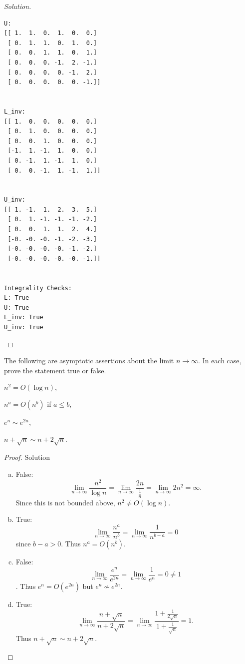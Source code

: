 \documentclass{article}
\newenvironment{problem}[2][Problem]{\begin{trivlist}
\item[\hskip \labelsep {\bfseries #1}\hskip \labelsep {\bfseries #2.}]}{\end{trivlist}}
\theoremstyle{definition}
\begin{document}
\begin{proof}[Solution]
\begin{verbatim}
U:
[[ 1.  1.  0.  1.  0.  0.]
 [ 0.  1.  1.  0.  1.  0.]
 [ 0.  0.  1.  1.  0.  1.]
 [ 0.  0.  0. -1.  2. -1.]
 [ 0.  0.  0.  0. -1.  2.]
 [ 0.  0.  0.  0.  0. -1.]]


L_inv:
[[ 1.  0.  0.  0.  0.  0.]
 [ 0.  1.  0.  0.  0.  0.]
 [ 0.  0.  1.  0.  0.  0.]
 [-1.  1. -1.  1.  0.  0.]
 [ 0. -1.  1. -1.  1.  0.]
 [ 0.  0. -1.  1. -1.  1.]]


U_inv:
[[ 1. -1.  1.  2.  3.  5.]
 [ 0.  1. -1. -1. -1. -2.]
 [ 0.  0.  1.  1.  2.  4.]
 [-0. -0. -0. -1. -2. -3.]
 [-0. -0. -0. -0. -1. -2.]
 [-0. -0. -0. -0. -0. -1.]]


Integrality Checks:
L: True
U: True
L_inv: True
U_inv: True
\end{verbatim}
\end{proof}



\begin{problem}{2.5.1}
    The following are asymptotic assertions about the limit $n \rightarrow \infty$. In each case, prove the statement true or false.
    
    \begin{enumerate*}[(a),itemjoin=\qquad]
        \item $n^2 = O(\log n)$,
        \item $n^a = O(n^b)$ if $a \leq b$,
        \item $e^n \sim e^{2n}$,
        \item $n + \sqrt{n} \sim n + 2\sqrt{n}$.
    \end{enumerate*}
\end{problem}
\begin{proof}{Solution}
\begin{enumerate}[(a)]
    \item False: $$\lim_{n \rightarrow \infty} \frac{n^2}{\log n} = \lim_{n \rightarrow \infty} \frac{2n}{\frac{1}{n}} = \lim_{n \rightarrow \infty} 2n^2 = \infty.$$ Since this is not bounded above, $n^2 \neq O(\log n)$.
    \item True: $$\lim_{n \rightarrow \infty} \frac{n^a}{n^b} = \lim_{n \rightarrow \infty}\frac{1}{n^{b-a}} = 0$$ since $b - a > 0$. Thus $n^a = O(n^b)$.
    \item False: $$\lim_{n \rightarrow \infty}\frac{e^n}{e^{2n}} = \lim_{n \rightarrow \infty}\frac{1}{e^n} = 0 \neq 1$$. Thus $e^n = O(e^{2n})$ but $e^n \nsim e^{2n}$.
    \item True: $$\lim_{n \rightarrow \infty}\frac{n + \sqrt{n}}{n + 2\sqrt{n}} = \lim_{n \rightarrow \infty}\frac{1 + \frac{1}{2\sqrt{n}}}{1 + \frac{1}{\sqrt{n}}} = 1.$$ Thus $n + \sqrt{n} \sim n + 2\sqrt{n}$.
\end{enumerate}
\end{proof}
\end{document}
